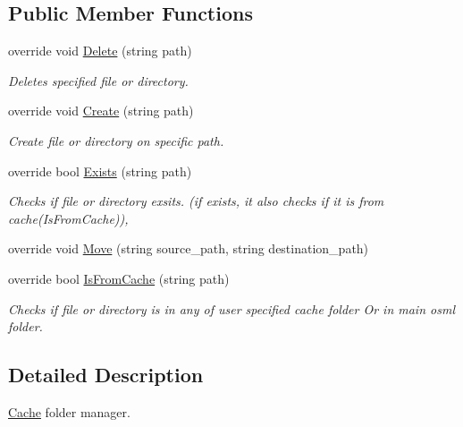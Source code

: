 \subsection*{Public Member Functions}
\begin{DoxyCompactItemize}
\item 
override void \mbox{\hyperlink{classOSML_1_1IO_1_1OSMLStorage_1_1CDirectory_a6568c6fcd267277ec3e032802fe50d1c}{Delete}} (string path)
\begin{DoxyCompactList}\small\item\em Deletes specified file or directory. \end{DoxyCompactList}\item 
override void \mbox{\hyperlink{classOSML_1_1IO_1_1OSMLStorage_1_1CDirectory_a25890d178542da52c0b87200cfe3cb87}{Create}} (string path)
\begin{DoxyCompactList}\small\item\em Create file or directory on specific path. \end{DoxyCompactList}\item 
override bool \mbox{\hyperlink{classOSML_1_1IO_1_1OSMLStorage_1_1CDirectory_ae4616522bb7f9a07084e461ea634965c}{Exists}} (string path)
\begin{DoxyCompactList}\small\item\em Checks if file or directory exsits. (if exists, it also checks if it is from cache(\+Is\+From\+Cache)), \end{DoxyCompactList}\item 
override void \mbox{\hyperlink{classOSML_1_1IO_1_1OSMLStorage_1_1CDirectory_a3cfadd280f91bf0b01e4ef9114d9499d}{Move}} (string source\+\_\+path, string destination\+\_\+path)
\item 
override bool \mbox{\hyperlink{classOSML_1_1IO_1_1OSMLStorage_1_1CDirectory_a7d4783f478aab61af2df5b91c4cc3c7d}{Is\+From\+Cache}} (string path)
\begin{DoxyCompactList}\small\item\em Checks if file or directory is in any of user specified cache folder Or in main osml folder. \end{DoxyCompactList}\end{DoxyCompactItemize}


\subsection{Detailed Description}
\mbox{\hyperlink{namespaceOSML_1_1Cache}{Cache}} folder manager. 



